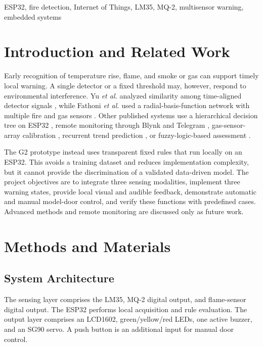 \documentclass[conference,onecolumn]{IEEEtran}
\begin{document}
\begin{IEEEkeywords}
ESP32, fire detection, Internet of Things, LM35, MQ-2, multisensor warning, embedded systems
\end{IEEEkeywords}

\section{Introduction and Related Work}
Early recognition of temperature rise, flame, and smoke or gas can support timely local warning. A single detector or a fixed threshold may, however, respond to environmental interference. Yu \emph{et al.} analyzed similarity among time-aligned detector signals \cite{yu2023multidetector}, while Fathoni \emph{et al.} used a radial-basis-function network with multiple fire and gas sensors \cite{fathoni2025multisensor}. Other published systems use a hierarchical decision tree on ESP32 \cite{purba2026smartsafety}, remote monitoring through Blynk and Telegram \cite{ramadani2026blynk}, gas-sensor-array calibration \cite{solorzano2022gas}, recurrent trend prediction \cite{nakip2021rtpnn}, or fuzzy-logic-based assessment \cite{rehman2021smartfire}.

The G2 prototype instead uses transparent fixed rules that run locally on an ESP32. This avoids a training dataset and reduces implementation complexity, but it cannot provide the discrimination of a validated data-driven model. The project objectives are to integrate three sensing modalities, implement three warning states, provide local visual and audible feedback, demonstrate automatic and manual model-door control, and verify these functions with predefined cases. Advanced methods and remote monitoring are discussed only as future work.

\section{Methods and Materials}

\subsection{System Architecture}
The sensing layer comprises the LM35, MQ-2 digital output, and flame-sensor digital output. The ESP32 performs local acquisition and rule evaluation. The output layer comprises an LCD1602, green/yellow/red LEDs, one active buzzer, and an SG90 servo. A push button is an additional input for manual door control.
\end{document}
